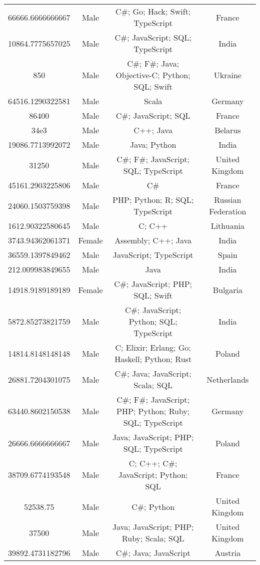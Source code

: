 \begin{center}
\begin{tabular}{ |c|c|c|c| }
66666.6666666667  &  Male  &  C\#; Go; Hack; Swift; TypeScript  &  France  \\ 
10864.7775657025  &  Male  &  C\#; JavaScript; SQL; TypeScript  &  India  \\ 
850  &  Male  &  C\#; F\#; Java; Objective-C; Python; SQL; Swift  &  Ukraine  \\ 
64516.1290322581  &  Male  &  Scala  &  Germany  \\ 
86400  &  Male  &  C\#; JavaScript; SQL  &  France  \\ 
34e3  &  Male  &  C++; Java  &  Belarus  \\ 
19086.7713992072  &  Male  &  Java; Python  &  India  \\ 
31250  &  Male  &  C\#; F\#; JavaScript; SQL; TypeScript  &  United Kingdom  \\ 
45161.2903225806  &  Male  &  C\#  &  France  \\ 
24060.1503759398  &  Male  &  PHP; Python; R; SQL; TypeScript  &  Russian Federation  \\ 
1612.90322580645  &  Male  &  C; C++  &  Lithuania  \\ 
3743.94362061371  &  Female  &  Assembly; C++; Java  &  India  \\ 
36559.1397849462  &  Male  &  JavaScript; TypeScript  &  Spain  \\ 
212.009983849655  &  Male  &  Java  &  India  \\ 
14918.9189189189  &  Female  &  C\#; JavaScript; PHP; SQL; Swift  &  Bulgaria  \\ 
5872.85273821759  &  Male  &  C\#; JavaScript; Python; SQL; TypeScript  &  India  \\ 
14814.8148148148  &  Male  &  C; Elixir; Erlang; Go; Haskell; Python; Rust  &  Poland  \\ 
26881.7204301075  &  Male  &  C\#; Java; JavaScript; Scala; SQL  &  Netherlands  \\ 
63440.8602150538  &  Male  &  C\#; F\#; JavaScript; PHP; Python; Ruby; SQL; TypeScript  &  Germany  \\ 
26666.6666666667  &  Male  &  Java; JavaScript; PHP; SQL; TypeScript  &  Poland  \\ 
38709.6774193548  &  Male  &  C; C++; C\#; JavaScript; Python; SQL  &  France  \\ 
52538.75  &  Male  &  C\#; Python  &  United Kingdom  \\ 
37500  &  Male  &  Java; JavaScript; PHP; Ruby; Scala; SQL  &  United Kingdom  \\ 
39892.4731182796  &  Male  &  C\#; Java; JavaScript  &  Austria  \\ 

\end{tabular}
\end{center}
